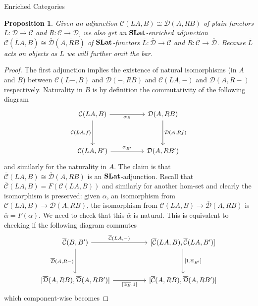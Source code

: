 \documentclass[acmsmall, screen, nonacm]{acmart}
\newtheorem{proposition}[theorem]{Proposition}
\newcommand\enriched[1]{{\overline{\mathcal{#1}}}}
\begin{document}
\begin{section}{Enriched Categories}
\begin{proposition}
  Given an adjunction $\mathcal{C}(LA,B) \cong \mathcal{D}(A,RB)$ of plain functors $L : \mathcal{D} \to \mathcal{C}$ and $R : \mathcal{C} \to \mathcal{D}$, we also get an $\mathbf{SLat}$-enriched adjunction $\enriched{C}(\overline{L}A,B) \cong \enriched{D}(A, \overline{R}B)$ of $\mathbf{SLat}$-functors $\overline{L} : \enriched{D} \to \enriched{C}$ and $\overline{R} : \enriched{C} \to \enriched{D}$.
  Because $\overline{L}$ acts on objects as $L$ we will further omit the bar.
\end{proposition}
\begin{proof}
  The first adjunction implies the existence of natural isomorphisms (in $A$ and $B$) between $\mathcal{C}(L-,B)$ and $\mathcal{D}(-,RB)$ and $\mathcal{C}(LA,-)$ and $\mathcal{D}(A,R-)$ respectively.
  Naturality in $B$ is by definition the commutativity of the following diagram
  \begin{equation}
    \label{diag:naturality_plain}
  \begin{tikzcd}
	{\mathcal{C}(LA,B)} && {\mathcal{D}(A,RB)} \\
	\\
	{\mathcal{C}(LA,B')} && {\mathcal{D}(A,RB')}
	\arrow["{\alpha_{B}}"', from=1-1, to=1-3]
	\arrow["{\mathcal{C}(LA,f)}"', from=1-1, to=3-1]
	\arrow["{\mathcal{D}(A,Rf)}", from=1-3, to=3-3]
	\arrow["{\alpha_{B'}}", from=3-1, to=3-3]
  \end{tikzcd}
\end{equation}
  and similarly for the naturality in $A$.
  The claim is that $\enriched{C}(LA,B) \cong \enriched{D}(A,RB)$ is an $\mathbf{SLat}$-adjunction.
  Recall that $\enriched{C}(LA,B) = F(\mathcal{C}(LA,B))$ and similarly for another hom-set and clearly the isomorphism is preserved: given $\alpha$, an isomorphism from $\mathcal{C}(LA,B) \to \mathcal{D}(A,RB)$, the isomorphism from $\enriched{C}(LA,B) \to \enriched{D}(A,RB)$ is $\enriched{\alpha} = F(\alpha)$.
  We need to check that this $\enriched{\alpha}$ is natural.
  This is equivalent to checking if the following diagram commutes
  \[\begin{tikzcd}
	{\enriched{C}(B,B')} && {[\enriched{C}(LA,B),\enriched{C}(LA,B')]} \\
	\\
	{[\enriched{D}(A,RB),\enriched{D}(A,RB')]} && {[\enriched{C}(A,RB),\enriched{D}(A,RB')]}
	\arrow["{\enriched{C}(LA,-)}", from=1-1, to=1-3]
	\arrow["{\enriched{D}(A,R-)}"', from=1-1, to=3-1]
	\arrow["{[1,\overline{\alpha}_{B'}]}", from=1-3, to=3-3]
	\arrow["{[\overline{\alpha_{B}},1]}"', from=3-1, to=3-3]
\end{tikzcd}\]
which component-wise becomes


\end{proof}
\end{section}
\end{document}
